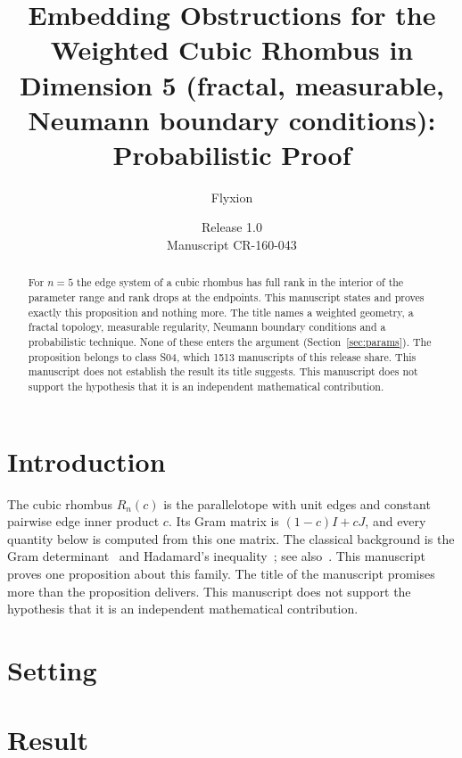 \documentclass[11pt]{article}
\title{Embedding Obstructions for the Weighted Cubic Rhombus in Dimension 5 (fractal, measurable, Neumann boundary conditions): Probabilistic Proof}
\author{Flyxion}
\date{Release 1.0\\ Manuscript CR-160-043}
\begin{document}
\maketitle
\begin{abstract}
For $n=5$ the edge system of a cubic rhombus has full rank in the interior of the parameter range and rank drops at the endpoints. This manuscript states and proves exactly this proposition and nothing more. The title names a weighted geometry, a fractal topology, measurable regularity, Neumann boundary conditions and a probabilistic technique. None of these enters the argument (Section~\ref{sec:params}). The proposition belongs to class S04, which 1513 manuscripts of this release share. This manuscript does not establish the result its title suggests. This manuscript does not support the hypothesis that it is an independent mathematical contribution.
\end{abstract}

\section{Introduction}
The cubic rhombus $R_n(c)$ is the parallelotope with unit edges and constant pairwise edge inner product $c$. Its Gram matrix is $(1-c)I+cJ$, and every quantity below is computed from this one matrix. The classical background is the Gram determinant~\cite{gram} and Hadamard's inequality~\cite{hadamard}; see also~\cite{hj}.
This manuscript proves one proposition about this family. The title of the manuscript promises more than the proposition delivers. This manuscript does not support the hypothesis that it is an independent mathematical contribution.

\section{Setting}


\section{Result}

\end{document}
